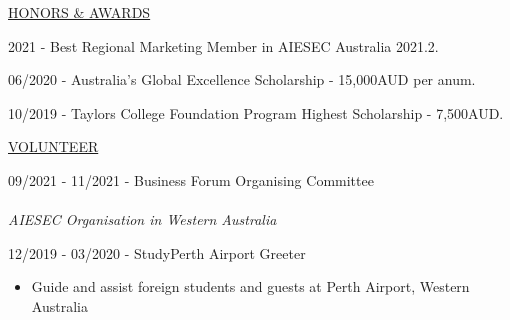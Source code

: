 \documentclass[11pt]{article}
\newcommand{\betteruline}[1]{
    \uline{#1}
}
\newcommand{\sectiontitle}[1]{
    \begingroup
        \titlebold
        \betteruline{\Large\uppercase{#1}  }
        \vspace{1.7mm}
    \endgroup
}
\newcommand{\sectioncontent}[1]{
    \begingroup
        \begin{FlushLeft}
        \vspace{-3mm}
        \sffamily\small#1
        \end{FlushLeft}
    \endgroup
    \vspace{2mm}
}
\newcommand{\spacevv}{
    \vspace{2mm}
}
\newcommand{\honor}[2]{
    \textcolor{black!70}{#1} - #2 \\
    \vspace{1.5mm}
}
\begin{document}
\begin{paracol}{2}
    \sectiontitle{Honors \& Awards}
    \sectioncontent{
        \honor{2021}{ Best Regional Marketing Member in AIESEC Australia 2021.2.}
        \vspace{2mm}
        \honor{06/2020}{ Australia's Global Excellence Scholarship - 15,000AUD per anum.}
        \vspace{2mm}
        \honor{10/2019}{Taylors College Foundation Program Highest Scholarship - 7,500AUD.}
    }

    \sectiontitle{Volunteer}
    \sectioncontent{
    \honor{09/2021 - 11/2021}{Business Forum Organising Committee } \\
    \textcolor{black!70}{\textit{AIESEC Organisation in Western Australia}} \\
    \spacevv
    \honor{12/2019 - 03/2020}{StudyPerth Airport Greeter}
    \begin{itemize}
        \item Guide and assist foreign students and guests at Perth Airport, Western Australia
    \end{itemize}
    }

    \switchcolumn


\end{paracol}
\end{document}
